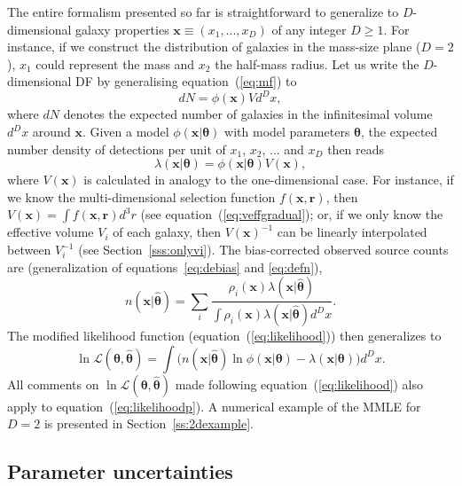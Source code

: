 \documentclass[a4paper,fleqn,usenatbib]{mnras}
\newcommand{\be}{\begin{equation}}
\newcommand{\ee}{\end{equation}}
\renewcommand{\r}{\mathbf{r}}
\newcommand{\veff}{V}%
\renewcommand{\L}{\mathcal{L}}
\newcommand{\x}{\mathbf{x}}
\newcommand{\eq}[1]{equation~(\ref{eq:#1})}
\renewcommand{\ss}[1]{Section~\ref{ss:#1}}
\newcommand{\para}{{\bm{\theta}}}
\begin{document}
The entire formalism presented so far is straightforward to generalize to $D$-dimensional galaxy properties $\x\equiv(x_1,...,x_D)$ of any integer $D\geq1$. For instance, if we construct the distribution of galaxies in the mass-size plane ($D=2$), $x_1$ could represent the mass and $x_2$ the half-mass radius. Let us write the $D$-dimensional DF by generalising \eq{mf} to
%
\be\label{eq:mfp}
	dN = \phi(\x) V d^Dx,
\ee
%
where $dN$ denotes the expected number of galaxies in the infinitesimal volume $d^Dx$ around $\x$. Given a model $\phi(\x|\para)$ with model parameters $\para$, the expected number density of detections per unit of $x_1$, $x_2$, ... and $x_D$ then reads
%
\be
	\lambda(\x|\para) = \phi(\x|\para)\veff(\x), \label{eq:deflambdap}
\ee
%
where $\veff(\x)$ is calculated in analogy to the one-dimensional case. For instance, if we know the multi-dimensional selection function $f(\x,\r)$, then $\veff(\x)=\int f(\x,\r)d^3r$ (see \eq{veffgradual}; or, if we only know the effective volume $V_i$ of each galaxy, then $\veff(\x)^{-1}$ can be linearly interpolated between $V_i^{-1}$ (see Section~\ref{sss:onlyvi}). The bias-corrected observed source counts are (generalization of equations~\ref{eq:debias} and \ref{eq:defn}),
%	
\be\label{eq:defnp}
	n(\x|\hat\para) = \sum_i\frac{\rho_i(\x)\lambda(\x|\hat\para)}{\int\rho_i(\x)\lambda(\x|\hat\para)d^Dx}. 
\ee
%
The modified likelihood function (\eq{likelihood}) then generalizes to
%
\be\label{eq:likelihoodp}
	\ln \L(\para,\hat\para) = \int\Big(n(\x|\hat\para)\ln\phi(\x|\para)-\lambda(\x|\para)\Big)d^Dx.
\ee
%
All comments on $\ln\L(\para,\hat\para)$ made following \eq{likelihood} also apply to \eq{likelihoodp}. A numerical example of the MMLE for $D=2$ is presented in \ss{2dexample}.

\subsection{Parameter uncertainties}\label{ss:uncertainties}
\end{document}
